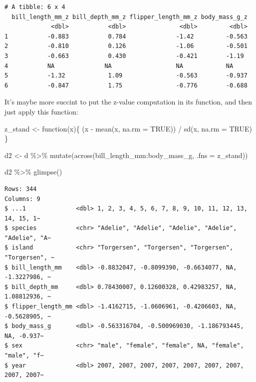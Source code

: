 \documentclass[
  letterpaper,
  DIV=11,
  numbers=noendperiod]{scrreprt}
\newenvironment{Shaded}{\begin{snugshade}}{\end{snugshade}}
\newcommand{\AttributeTok}[1]{\textcolor[rgb]{0.40,0.45,0.13}{#1}}
\newcommand{\ConstantTok}[1]{\textcolor[rgb]{0.56,0.35,0.01}{#1}}
\newcommand{\ControlFlowTok}[1]{\textcolor[rgb]{0.00,0.23,0.31}{#1}}
\newcommand{\FunctionTok}[1]{\textcolor[rgb]{0.28,0.35,0.67}{#1}}
\newcommand{\NormalTok}[1]{\textcolor[rgb]{0.00,0.23,0.31}{#1}}
\newcommand{\OtherTok}[1]{\textcolor[rgb]{0.00,0.23,0.31}{#1}}
\newcommand{\SpecialCharTok}[1]{\textcolor[rgb]{0.37,0.37,0.37}{#1}}
\theoremstyle{definition}
\theoremstyle{definition}
\theoremstyle{remark}
\begin{document}
\begin{verbatim}
# A tibble: 6 x 4
  bill_length_mm_z bill_depth_mm_z flipper_length_mm_z body_mass_g_z
             <dbl>           <dbl>               <dbl>         <dbl>
1           -0.883           0.784              -1.42         -0.563
2           -0.810           0.126              -1.06         -0.501
3           -0.663           0.430              -0.421        -1.19 
4           NA              NA                  NA            NA    
5           -1.32            1.09               -0.563        -0.937
6           -0.847           1.75               -0.776        -0.688
\end{verbatim}

It's maybe more succint to put the z-value computation in its function,
and then just apply this function:

\begin{Shaded}
\begin{Highlighting}[]
\NormalTok{z\_stand }\OtherTok{\textless{}{-}} \ControlFlowTok{function}\NormalTok{(x)\{}
\NormalTok{  (x }\SpecialCharTok{{-}} \FunctionTok{mean}\NormalTok{(x, }\AttributeTok{na.rm =} \ConstantTok{TRUE}\NormalTok{)) }\SpecialCharTok{/} \FunctionTok{sd}\NormalTok{(x, }\AttributeTok{na.rm =} \ConstantTok{TRUE}\NormalTok{)}
\NormalTok{\}}
\end{Highlighting}
\end{Shaded}

\begin{Shaded}
\begin{Highlighting}[]
\NormalTok{d2 }\OtherTok{\textless{}{-}}
\NormalTok{d }\SpecialCharTok{\%\textgreater{}\%} 
  \FunctionTok{mutate}\NormalTok{(}\FunctionTok{across}\NormalTok{(bill\_length\_mm}\SpecialCharTok{:}\NormalTok{body\_mass\_g, }
                \AttributeTok{.fns =}\NormalTok{ z\_stand))}
  
\NormalTok{d2 }\SpecialCharTok{\%\textgreater{}\%} 
  \FunctionTok{glimpse}\NormalTok{()}
\end{Highlighting}
\end{Shaded}

\begin{verbatim}
Rows: 344
Columns: 9
$ ...1              <dbl> 1, 2, 3, 4, 5, 6, 7, 8, 9, 10, 11, 12, 13, 14, 15, 1~
$ species           <chr> "Adelie", "Adelie", "Adelie", "Adelie", "Adelie", "A~
$ island            <chr> "Torgersen", "Torgersen", "Torgersen", "Torgersen", ~
$ bill_length_mm    <dbl> -0.8832047, -0.8099390, -0.6634077, NA, -1.3227986, ~
$ bill_depth_mm     <dbl> 0.78430007, 0.12600328, 0.42983257, NA, 1.08812936, ~
$ flipper_length_mm <dbl> -1.4162715, -1.0606961, -0.4206603, NA, -0.5628905, ~
$ body_mass_g       <dbl> -0.563316704, -0.500969030, -1.186793445, NA, -0.937~
$ sex               <chr> "male", "female", "female", NA, "female", "male", "f~
$ year              <dbl> 2007, 2007, 2007, 2007, 2007, 2007, 2007, 2007, 2007~
\end{verbatim}
\end{document}
